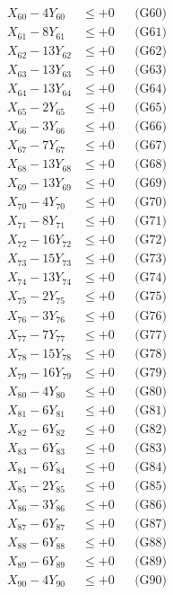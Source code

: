 \documentclass[a4paper,10pt]{article}
\begin{document}
{\begin{align}
X_{60} - 4Y_{60} &\leq +0 && \text{(G60)} \\
X_{61} - 8Y_{61} &\leq +0 && \text{(G61)} \\
X_{62} - 13Y_{62} &\leq +0 && \text{(G62)} \\
X_{63} - 13Y_{63} &\leq +0 && \text{(G63)} \\
X_{64} - 13Y_{64} &\leq +0 && \text{(G64)} \\
X_{65} - 2Y_{65} &\leq +0 && \text{(G65)} \\
X_{66} - 3Y_{66} &\leq +0 && \text{(G66)} \\
X_{67} - 7Y_{67} &\leq +0 && \text{(G67)} \\
X_{68} - 13Y_{68} &\leq +0 && \text{(G68)} \\
X_{69} - 13Y_{69} &\leq +0 && \text{(G69)} \\
\allowbreak
X_{70} - 4Y_{70} &\leq +0 && \text{(G70)} \\
X_{71} - 8Y_{71} &\leq +0 && \text{(G71)} \\
X_{72} - 16Y_{72} &\leq +0 && \text{(G72)} \\
X_{73} - 15Y_{73} &\leq +0 && \text{(G73)} \\
X_{74} - 13Y_{74} &\leq +0 && \text{(G74)} \\
X_{75} - 2Y_{75} &\leq +0 && \text{(G75)} \\
X_{76} - 3Y_{76} &\leq +0 && \text{(G76)} \\
X_{77} - 7Y_{77} &\leq +0 && \text{(G77)} \\
X_{78} - 15Y_{78} &\leq +0 && \text{(G78)} \\
X_{79} - 16Y_{79} &\leq +0 && \text{(G79)} \\
\allowbreak
X_{80} - 4Y_{80} &\leq +0 && \text{(G80)} \\
X_{81} - 6Y_{81} &\leq +0 && \text{(G81)} \\
X_{82} - 6Y_{82} &\leq +0 && \text{(G82)} \\
X_{83} - 6Y_{83} &\leq +0 && \text{(G83)} \\
X_{84} - 6Y_{84} &\leq +0 && \text{(G84)} \\
X_{85} - 2Y_{85} &\leq +0 && \text{(G85)} \\
X_{86} - 3Y_{86} &\leq +0 && \text{(G86)} \\
X_{87} - 6Y_{87} &\leq +0 && \text{(G87)} \\
X_{88} - 6Y_{88} &\leq +0 && \text{(G88)} \\
X_{89} - 6Y_{89} &\leq +0 && \text{(G89)} \\
\allowbreak
X_{90} - 4Y_{90} &\leq +0 && \text{(G90)} \\

\end{align}}
\end{document}
